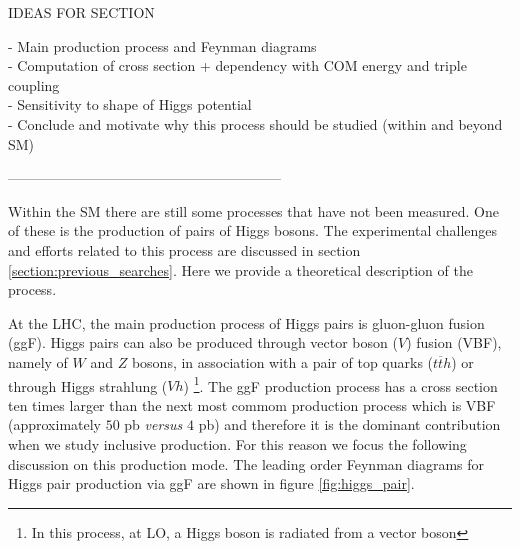 IDEAS FOR SECTION

- Main production process and Feynman diagrams \\
- Computation of cross section + dependency with COM energy and triple coupling\\
- Sensitivity to shape of Higgs potential\\
- Conclude and motivate why this process should be studied (within and beyond SM)

-----------------------------------------------------------

Within the SM there are still some processes that have not been measured. One of these is the production of pairs of Higgs bosons. The experimental challenges and efforts related to this process are discussed in section \ref{section:previous_searches}. Here we provide a theoretical description of the process.

At the LHC, the main production process of Higgs pairs is gluon-gluon fusion (ggF). Higgs pairs can also be produced through vector boson ($V$) fusion (VBF), namely of $W$ and $Z$ bosons, in association with a pair of top quarks ($t\overline{t}h$) or through Higgs strahlung ($Vh$) \footnote{In this process, at LO, a Higgs boson is radiated from a vector boson}. The ggF production process has a cross section ten times larger than the next most commom production process which is VBF (approximately $50$ pb \textit{versus} $4$ pb) and therefore it is the dominant contribution when we study inclusive production. For this reason we focus the following discussion on this production mode. The leading order Feynman diagrams for Higgs pair production via ggF are shown in figure \ref{fig:higgs_pair}. 



